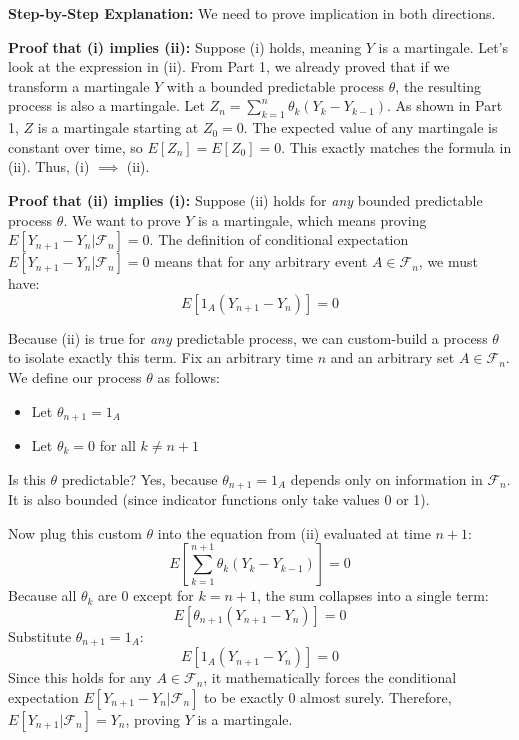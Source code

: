 \textbf{Step-by-Step Explanation:}
We need to prove implication in both directions.

\textbf{Proof that (i) implies (ii):}
Suppose (i) holds, meaning $Y$ is a martingale. 
Let's look at the expression in (ii). From Part 1, we already proved that if we transform a martingale $Y$ with a bounded predictable process $\theta$, the resulting process is also a martingale. 
Let $Z_n = \sum_{k=1}^n \theta_k(Y_k - Y_{k-1})$. As shown in Part 1, $Z$ is a martingale starting at $Z_0 = 0$.
The expected value of any martingale is constant over time, so $E[Z_n] = E[Z_0] = 0$. This exactly matches the formula in (ii). Thus, (i) $\implies$ (ii).

\textbf{Proof that (ii) implies (i):}
Suppose (ii) holds for \textit{any} bounded predictable process $\theta$. We want to prove $Y$ is a martingale, which means proving $E[Y_{n+1} - Y_n | \mathcal{F}_n] = 0$.
The definition of conditional expectation $E[Y_{n+1} - Y_n | \mathcal{F}_n] = 0$ means that for any arbitrary event $A \in \mathcal{F}_n$, we must have:
\[ E[1_A(Y_{n+1} - Y_n)] = 0 \]

Because (ii) is true for \textit{any} predictable process, we can custom-build a process $\theta$ to isolate exactly this term. 
Fix an arbitrary time $n$ and an arbitrary set $A \in \mathcal{F}_n$. We define our process $\theta$ as follows:
\begin{itemize}
    \item Let $\theta_{n+1} = 1_A$
    \item Let $\theta_k = 0$ for all $k \neq n+1$
\end{itemize}

Is this $\theta$ predictable? Yes, because $\theta_{n+1} = 1_A$ depends only on information in $\mathcal{F}_n$. It is also bounded (since indicator functions only take values 0 or 1).

Now plug this custom $\theta$ into the equation from (ii) evaluated at time $n+1$:
\[ E\left[\sum_{k=1}^{n+1} \theta_k(Y_k - Y_{k-1})\right] = 0 \]
Because all $\theta_k$ are 0 except for $k=n+1$, the sum collapses into a single term:
\[ E[\theta_{n+1}(Y_{n+1} - Y_n)] = 0 \]
Substitute $\theta_{n+1} = 1_A$:
\[ E[1_A(Y_{n+1} - Y_n)] = 0 \]
Since this holds for any $A \in \mathcal{F}_n$, it mathematically forces the conditional expectation $E[Y_{n+1} - Y_n | \mathcal{F}_n]$ to be exactly 0 almost surely. Therefore, $E[Y_{n+1} | \mathcal{F}_n] = Y_n$, proving $Y$ is a martingale.